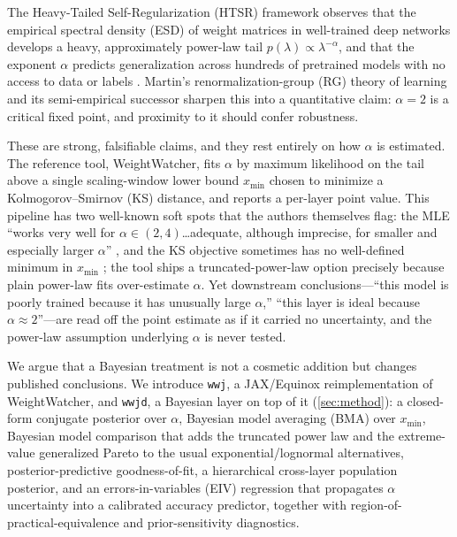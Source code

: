 \documentclass{article} %
\begin{document}
The Heavy-Tailed Self-Regularization (HTSR) framework \citep{martin2021implicit,martin2019traditional}
observes that the empirical spectral density (ESD) of weight matrices in well-trained deep networks
develops a heavy, approximately power-law tail $p(\lambda) \propto \lambda^{-\alpha}$, and that the
exponent $\alpha$ predicts generalization across hundreds of pretrained models with no access to data
or labels \citep{martin2021predicting}. Martin's renormalization-group (RG) theory of learning
\citep{martin2026rg} and its semi-empirical successor \citep{martin2025setol} sharpen this into a
quantitative claim: $\alpha = 2$ is a critical fixed point, and proximity to it should confer robustness.

These are strong, falsifiable claims, and they rest entirely on how $\alpha$ is estimated. The reference
tool, WeightWatcher, fits $\alpha$ by maximum likelihood on the tail above a single scaling-window lower
bound $x_{\min}$ chosen to minimize a Kolmogorov--Smirnov (KS) distance, and reports a per-layer point
value. This pipeline has two well-known soft spots that the authors themselves flag: the MLE ``works
very well for $\alpha \in (2,4)$\ldots adequate, although imprecise, for smaller and especially larger
$\alpha$'' \citep{martin2021predicting}, and the KS objective sometimes has no well-defined minimum in
$x_{\min}$ \citep{martin2021postmortem}; the tool ships a truncated-power-law option precisely because
plain power-law fits over-estimate $\alpha$. Yet downstream conclusions---``this model is poorly trained
because it has unusually large $\alpha$,'' ``this layer is ideal because $\alpha \approx 2$''---are read
off the point estimate as if it carried no uncertainty, and the power-law assumption underlying $\alpha$
is never tested.

We argue that a Bayesian treatment is not a cosmetic addition but changes published conclusions. We
introduce \texttt{wwj}, a JAX/Equinox \citep{jax2018,kidger2021equinox} reimplementation of WeightWatcher,
and \texttt{wwjd}, a Bayesian layer on top of it (\cref{sec:method}): a closed-form conjugate posterior
over $\alpha$, Bayesian model averaging (BMA) over $x_{\min}$, Bayesian model comparison that adds the
truncated power law and the extreme-value generalized Pareto to the usual exponential/lognormal
alternatives, posterior-predictive goodness-of-fit, a hierarchical cross-layer population posterior, and
an errors-in-variables (EIV) regression that propagates $\alpha$ uncertainty into a calibrated accuracy
predictor, together with region-of-practical-equivalence and prior-sensitivity diagnostics.
\end{document}
